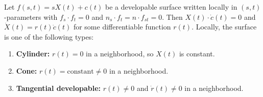 Let $f(s, t) = s X(t) + c(t)$ be a developable surface written locally in $(s, t)$-parameters with $f_s \cdot f_t = 0$ and $n_s \cdot f_t = n \cdot f_{st} = 0$. Then $X(t) \cdot \dot{c}(t) = 0$ and $\dot{X}(t) = r(t) \dot{c}(t)$ for some differentiable function $r(t)$. Locally, the surface is one of the following types:

\begin{enumerate}
\item \textbf{Cylinder:} $r(t) = 0$ in a neighborhood, so $X(t)$ is constant.
\item \textbf{Cone:} $r(t) = \text{constant} \neq 0$ in a neighborhood.
\item \textbf{Tangential developable:} $r(t) \neq 0$ and $\dot{r}(t) \neq 0$ in a neighborhood.
\end{enumerate}
